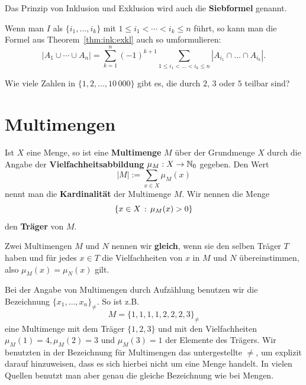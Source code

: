\begin{bem}
	Das Prinzip von Inklusion und Exklusion wird auch die \textbf{Siebformel} genannt. 
\end{bem} 

\begin{bem}
	Wenn man $I$ als $\{i_1,\ldots,i_k\}$ mit $1 \le i_1 < \cdots < i_k \le n$ führt, so kann man die Formel aus Theorem~\ref{thm:ink:exkl} auch so umformulieren: 
	\[
		|A_1 \cup \cdots \cup A_n| = \sum_{k=1}^n (-1)^{k+1} \sum_{1 \le i_1 < \ldots < i_k \le n} | A_{i_1} \cap \ldots \cap A_{i_k}|. 
	\]
\end{bem} 

\begin{aufg}
	Wie viele Zahlen in $\{1,2,\ldots,10\,000\}$ gibt es, die durch $2$, $3$ oder $5$ teilbar sind? 
\end{aufg} 


\section{Multimengen} 

\begin{defn}
Ist $X$ eine Menge, so ist eine \textbf{Multimenge} $M$ über der Grundmenge $X$ durch die Angabe der \textbf{Vielfachheitsabbildung} $\mu_M : X \to \mathbb{N}_0$ gegeben. Den Wert 
\[
	|M|:=\sum_{x \in X} \mu_M(x)
\]
nennt man die \textbf{Kardinalität} der Multimenge $M$.  Wir nennen die Menge 
\[
	\left\{  x \in X \,:\, \mu_M(x)>0 \right\}
\]
den \textbf{Träger} von $M$.

Zwei Multimengen $M$ und $N$ nennen wir \textbf{gleich}, wenn sie den selben Träger $T$ haben und für jedes $x \in T$ die Vielfachheiten von $x$ in $M$ und $N$ übereinstimmen, also $\mu_M(x) = \mu_N(x)$ gilt.
\end{defn} 

\begin{bem}
	Bei der Angabe von Multimengen durch Aufzählung benutzen wir die Bezeichnung $\{x_1,\ldots,x_n\}_{\ne}$. So ist z.B. 
	\[
			M = \{1,1,1,1,2,2,2,3\}_{\ne}
	\]
	eine Multimenge mit dem Träger $\{1,2,3\}$ und mit den Vielfachheiten $\mu_M(1) =4, \mu_M(2)=3$ und $\mu_M(3)=1$ der Elemente des Trägers. Wir benutzten in der Bezeichnung für Multimengen das untergestellte $\ne$, um explizit darauf hinzuweisen, dass es sich hierbei nicht um eine Menge handelt. In vielen Quellen benutzt man aber genau die gleiche Bezeichnung wie bei Mengen. 
\end{bem}

